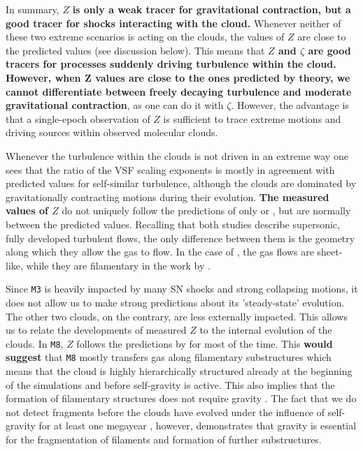 In summary, $Z$ \textbf{is only a weak tracer for gravitational contraction, but a good tracer for shocks interacting with the cloud.}
Whenever neither of these two extreme scenarios is acting on the clouds, the values of $Z$ are close to the predicted values (see discussion below).
This means that \textbf{$Z$ and $\zeta$ are good tracers for processes suddenly driving turbulence within the cloud.
However, when Z values are close to the ones predicted by theory, we cannot differentiate between freely decaying turbulence and moderate gravitational contraction}, as one can do it with $\zeta$.
However, the advantage is that a single-epoch observation of $Z$ is sufficient to trace extreme motions and driving sources within observed molecular clouds.

Whenever the turbulence within the clouds is not driven in an extreme way one sees that the ratio of the VSF scaling exponents is mostly in agreement with predicted values for self-similar turbulence, although the clouds are dominated by gravitationally contracting motions during their evolution.
\textbf{The measured values of $Z$} do not uniquely follow the predictions of only \citet{Boldyrev2002} or \citet{She1994}, but are normally between the predicted values.
Recalling that both studies describe supersonic, fully developed turbulent flows, the only difference between them is the geometry along which they allow the gas to flow.
In the case of \citet{Boldyrev2002}, the gas flows are sheet-like, while they are filamentary in the work by \citet{She1994}.

Since \texttt{M3} is heavily impacted by many SN shocks and strong collapsing motions, it does not allow us to make strong predictions about its 'steady-state' evolution.
The other two clouds, on the contrary, are less externally impacted.
This allows us to relate the developments of measured $Z$ to the internal evolution of the clouds.
In \texttt{M8}, $Z$ follows the predictions by \citet{She1994} for most of the time.
This \textbf{would suggest} that \texttt{M8} mostly transfers gas along filamentary substructures which means that the cloud is highly hierarchically structured already at the beginning of the simulations and before self-gravity is active.
This also implies that the formation of filamentary structures does not require gravity \citep[e.g.,][]{Federrath2016}.
The fact that we do not detect fragments before the clouds have evolved under the influence of self-gravity for at least one megayear , however, demonstrates that gravity is essential for the fragmentation of filaments and formation of further substructures.

